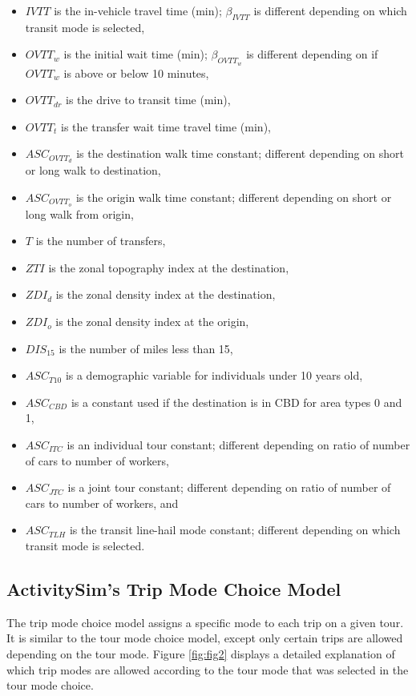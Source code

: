 \documentclass[12pt, oneside, openright]{byuthesis}
\providecommand{\tightlist}{%
  \setlength{\itemsep}{0pt}\setlength{\parskip}{0pt}}
\begin{document}
\begin{itemize}
\tightlist
\item
  \(IVTT\) is the in-vehicle travel time (min); \(\beta_{IVTT}\) is different depending on which transit mode is selected,
\item
  \(OVTT_w\) is the initial wait time (min); \(\beta_{OVTT_w}\) is different depending on if \(OVTT_w\) is above or below 10 minutes,
\item
  \(OVTT_{dr}\) is the drive to transit time (min),
\item
  \(OVTT_t\) is the transfer wait time travel time (min),\\
\item
  \(ASC_{OVTT_d}\) is the destination walk time constant; different depending on short or long walk to destination,
\item
  \(ASC_{OVTT_o}\) is the origin walk time constant; different depending on short or long walk from origin,
\item
  \(T\) is the number of transfers,
\item
  \(ZTI\) is the zonal topography index at the destination,
\item
  \(ZDI_d\) is the zonal density index at the destination,
\item
  \(ZDI_o\) is the zonal density index at the origin,
\item
  \(DIS_{15}\) is the number of miles less than 15,
\item
  \(ASC_{T10}\) is a demographic variable for individuals under 10 years old,
\item
  \(ASC_{CBD}\) is a constant used if the destination is in CBD for area types 0 and 1,
\item
  \(ASC_{ITC}\) is an individual tour constant; different depending on ratio of number of cars to number of workers,
\item
  \(ASC_{JTC}\) is a joint tour constant; different depending on ratio of number of cars to number of workers, and
\item
  \(ASC_{TLH}\) is the transit line-hail mode constant; different depending on which transit mode is selected.
\end{itemize}

\hypertarget{lit42}{%
\subsection{ActivitySim's Trip Mode Choice Model}\label{lit42}}

The trip mode choice model assigns a specific mode to each trip on a given tour. It is similar to the tour mode choice model, except only certain trips are allowed depending on the tour mode. Figure \ref{fig:fig2} displays a detailed explanation of which trip modes are allowed according to the tour mode that was selected in the tour mode choice.
\end{document}
